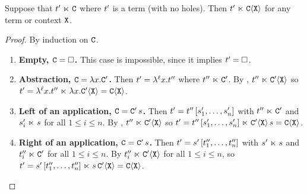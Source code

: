 \begin{lemma}
Suppose that $t' \mathrel{\ltimes} \mathtt{C}$ where $t'$ is a term (with no holes).
Then $t' \mathrel{\ltimes} \mathtt{C}\langle\mathtt{X}\rangle$ for any term or context $\mathtt{X}$.
\end{lemma}
\begin{proof}
By induction on $\mathtt{C}$.
\begin{enumerate}
\item {\bf Empty, $\mathtt{C} = \Box$.}
  This case is impossible, since it implies $t' = \Box$.
\item {\bf Abstraction, $\mathtt{C} = \lambda x. \mathtt{C}'$.}
  Then $t' = \lambda^{\ell} x. t''$ where $t'' \mathrel{\ltimes} \mathtt{C}'$.
  By \ih, $t'' \mathrel{\ltimes} \mathtt{C}'\langle\mathtt{X}\rangle$ so $t' = \lambda^{\ell} x. t'' \mathrel{\ltimes} \lambda x. \mathtt{C}'\langle\mathtt{X}\rangle = \mathtt{C}\langle\mathtt{X}\rangle$.
\item {\bf Left of an application, $\mathtt{C} = \mathtt{C}'\,s$.}
  Then $t' = t''\,[s'_1,\hdots,s'_n]$ with $t'' \mathrel{\ltimes} \mathtt{C}'$ and $s'_i \mathrel{\ltimes} s$ for all $1 \leq i \leq n$.
  By \ih, $t'' \mathrel{\ltimes} \mathtt{C}'\langle\mathtt{X}\rangle$ so $t' = t''\,[s'_1,\hdots,s'_n] \mathrel{\ltimes} \mathtt{C}'\langle\mathtt{X}\rangle\,s = \mathtt{C}\langle\mathtt{X}\rangle$.
\item {\bf Right of an application, $\mathtt{C} = \mathtt{C}'\,s$.}
  Then $t' = s'\,[t''_1,\hdots,t''_n]$ with $s' \mathrel{\ltimes} s$ and $t''_i \mathrel{\ltimes} \mathtt{C}'$ for all $1 \leq i \leq n$.
  By \ih $t''_i \mathrel{\ltimes} \mathtt{C}'\langle\mathtt{X}\rangle$ for all $1 \leq i \leq n$,
  so $t' = s'\,[t''_1,\hdots,t''_n] \mathrel{\ltimes} s\,\mathtt{C}'\langle\mathtt{X}\rangle = \mathtt{C}\langle\mathtt{X}\rangle$.
\end{enumerate}
\end{proof}
